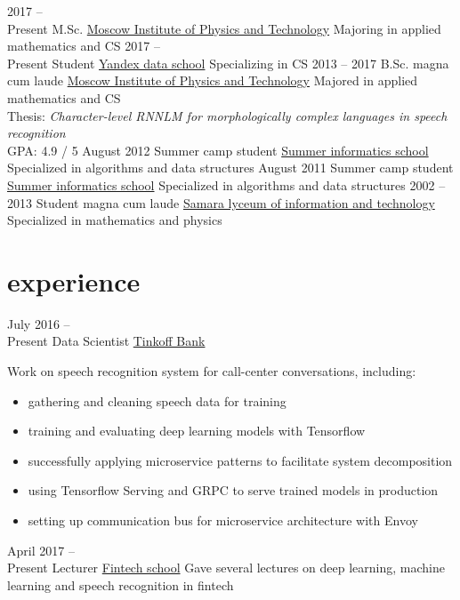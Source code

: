 \documentclass[]{friggeri-cv}
\begin{document}
\begin{entrylist}
  \entry
    {2017 -- \\ Present}
    {M.Sc.}
    {\href{https://mipt.ru/english/}{Moscow Institute of Physics and Technology}}
    {Majoring in applied mathematics and CS}
  \entry
  	{2017 -- \\ Present}
  	{Student}
  	{\href{https://yandexdataschool.com/}{Yandex data school}}
  	{Specializing in CS}
  \entry
    {2013 -- 2017}
    {B.Sc. {\normalfont magna cum laude}}
    {\href{https://mipt.ru/english/}{Moscow Institute of Physics and Technology}}
    {Majored in applied mathematics and CS \\
    Thesis: \emph{Character-level RNNLM for morphologically complex languages in speech recognition} \\
    GPA: 4.9 / 5}
  \entry
  	{August 2012}
  	{Summer camp student}
  	{\href{http://lksh.ru/}{Summer informatics school}}
  	{Specialized in algorithms and data structures}
  \entry
  	{August 2011}
  	{Summer camp student}
  	{\href{http://lksh.ru/}{Summer informatics school}}
  	{Specialized in algorithms and data structures}
  \entry
    {2002 -- 2013}
    {Student {\normalfont magna cum laude}}
    {\href{http://samlit.net/}{Samara lyceum of information and technology}}
    {Specialized in mathematics and physics}
\end{entrylist}

\section{experience}

\begin{entrylist}
  \entry
    {July 2016 -- \\ Present}
    {Data Scientist}
    {\href{https://www.tinkoff.ru/eng/}{Tinkoff Bank}}
    {Work on speech recognition system for call-center conversations, 
    	including:
    	\begin{itemize}
    		\item gathering and cleaning speech data for training
    		\item training and evaluating deep learning models with Tensorflow
    		\item successfully applying microservice patterns to facilitate system decomposition
    		\item using Tensorflow Serving and GRPC to serve trained models in production
    		\item setting up communication bus for microservice architecture with Envoy
    	\end{itemize}
     
    }
  \entry
    {April 2017 -- \\ Present}
    {Lecturer}
    {\href{https://fintech.tinkoff.ru/}{Fintech school}}
    {Gave several lectures on deep learning, machine learning and speech recognition in fintech}
\end{entrylist}
\end{document}
